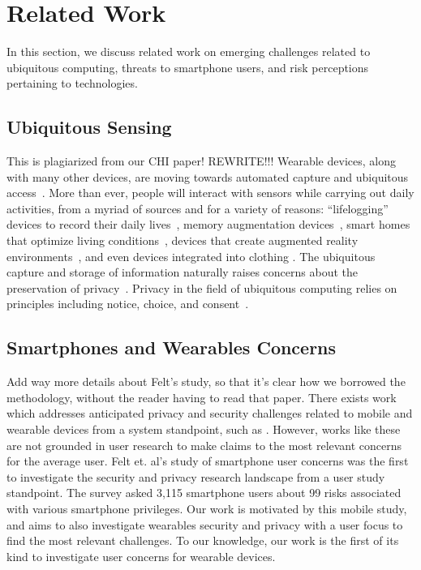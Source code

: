 \documentclass{acm_proc_article-sp}
\begin{document}

\section{Related Work}
In this section, we discuss related work on emerging challenges related to ubiquitous computing, threats to smartphone users, and risk perceptions pertaining to technologies. 

\subsection{Ubiquitous Sensing}
{\color{red} This is plagiarized from our CHI paper! REWRITE!!! } Wearable devices, along with many other devices, are moving towards automated capture and ubiquitous  access~\cite{abowd2000charting}. More than ever, people will interact with sensors while carrying out daily activities, from a myriad of sources and for a variety of reasons: ``lifelogging'' devices to record their daily lives~\cite{hoyle2014privacy,dickie2004augmenting}, memory augmentation devices~\cite{chen2010augmenting,devaul2003memory,kalnikaite2010now}, smart homes that optimize living conditions~\cite{chan2008review,chan2009smart,edwards2001home}, devices that create augmented reality environments~\cite{azuma1997survey,azuma2001recent}, and even devices integrated into clothing \cite{anliker2001weararm}. The ubiquitous capture and storage of information naturally raises concerns about the preservation of privacy~\cite{palen2003unpacking}. Privacy in the field of ubiquitous computing relies on principles including notice, choice, and consent~\cite{langheinrich2001privacy}.

\subsection{Smartphones and Wearables Concerns}
{\color{red} Add way more details about Felt's study, so that it's clear how we borrowed the methodology, without the reader having to read that paper.}
There exists work which addresses anticipated privacy and security challenges related to mobile and wearable devices from a system standpoint, such as \cite{DiPietro}. However, works like these are not grounded in user research to make claims to the most relevant concerns for the average user. Felt et. al's study of smartphone user concerns \cite{Felt} was the first to investigate the security and privacy research landscape from a user study standpoint. The survey asked 3,115 smartphone users about 99 risks associated with various smartphone privileges. Our work is motivated by this mobile study, and aims to also investigate wearables security and privacy with a user focus to find the most relevant challenges. To our knowledge, our work is the first of its kind to investigate user concerns for wearable devices.
\end{document}
